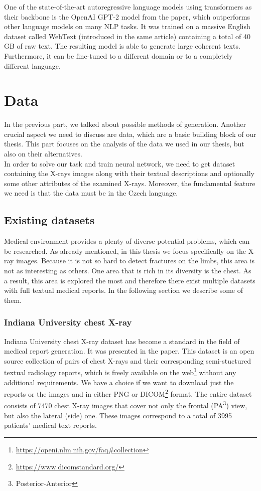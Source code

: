 One of the state-of-the-art autoregressive language models using transformers as their backbone is the OpenAI GPT-2 model from the \citet{radford2019language} paper, which outperforms other language models on many NLP tasks. It was trained on a massive English dataset called WebText (introduced in the same article) containing a total of 40 GB of raw text. The resulting model is able to generate large coherent texts. Furthermore, it can be fine-tuned to a different domain or to a completely different language.

\section{Data}
In the previous part, we talked about possible methods of generation. Another crucial aspect we need to discuss are data, which are a basic building block of our thesis. This part focuses on the analysis of the data we used in our thesis, but also on their alternatives. \\

In order to solve our task and train neural network, we need to get dataset containing the X-rays images along with their textual descriptions and optionally some other attributes of the examined X-rays. Moreover, the fundamental feature we need is that the data must be in the Czech language.

\subsection{Existing datasets}
\label{sec:datasets}
Medical environment provides a plenty of diverse potential problems, which can be researched. As already mentioned, in this thesis we focus specifically on the X-ray images. Because it is not so hard to detect fractures on the limbs, this area is not as interesting as others. One area that is rich in its diversity is the chest. As a result, this area is explored the most and therefore there exist multiple datasets with full textual medical reports. In the following section we describe some of them.\\

\subsubsection{Indiana University chest X-ray}
\label{sec:IUDataset}
Indiana University chest X-ray dataset has become a standard in the field of medical report generation. It was presented in the \citet{10.1093/jamia/ocv080} paper. This dataset is an open source collection of pairs of chest X-rays and their corresponding semi-stuctured textual radiology reports, which is freely available on the web\footnote[1]{\url{https://openi.nlm.nih.gov/faq\#collection}} without any additional requirements. We have a choice if we want to download just the reports or the images and in either PNG or DICOM\footnote[2]{\url{https://www.dicomstandard.org/}} format. The entire dataset consists of 7470 chest X-ray images that cover not only the frontal (PA\footnote[3]{Posterior-Anterior}) view, but also the lateral (side) one. These images correspond to a total of 3995 patients' medical text reports.\\

